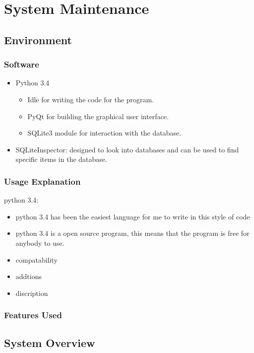 \chapter{System Maintenance}


\section{Environment}

\subsection{Software}
\begin{itemize}
	\item Python 3.4
	\begin{itemize}
		\item Idle for writing the code for the program.
		\item PyQt for building the graphical user interface.
		\item SQLite3 module for interaction with the database.
	\end{itemize}
	\item SQLiteInspector: designed to look into databases and can be used to find specific items in the database.
\end{itemize}
\subsection{Usage Explanation}
python 3.4:
\begin{itemize}
	\item python 3.4 has been the easiest language for me to write in this style of code  
	\item python 3.4 is a open source program, this means that the program is free for anybody to use.
	\item compatability
	\item addtions
	\item discription
\end{itemize}
\subsection{Features Used}

\section{System Overview}

